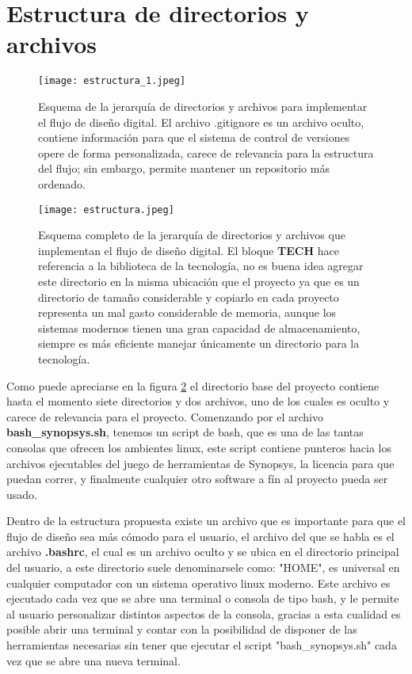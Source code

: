 \section{Estructura de directorios y archivos}

\begin{figure}[h]
\texttt{[image: estructura\_1.jpeg]}
\centering
\caption{Esquema de la jerarquía de directorios y archivos para implementar el flujo de diseño digital. El archivo .gitignore es un archivo oculto, contiene información para que el sistema de control de versiones opere de forma personalizada, carece de relevancia para la estructura del flujo; sin embargo, permite mantener un repositorio más ordenado. \cite{website:gitignore, website:cvs}}
\label{directorios}
\end{figure}


\begin{figure}[h]
\texttt{[image: estructura.jpeg]}
\centering
\caption{Esquema completo de la jerarquía de directorios y archivos que implementan el flujo de diseño digital. El bloque \textbf{TECH} hace referencia a la biblioteca de la tecnología, no es buena idea agregar este directorio en la misma ubicación que el proyecto ya que es un directorio de tamaño considerable y copiarlo en cada proyecto representa un mal gasto considerable de memoria, aunque los sistemas modernos tienen una gran capacidad de almacenamiento, siempre es más eficiente manejar únicamente un directorio para la tecnología.}
\label{directorios}
\end{figure}
Como puede apreciarse en la figura \ref{directorios} el directorio base del proyecto contiene hasta el momento siete directorios y dos archivos, uno de los cuales es oculto y carece de relevancia para el proyecto. Comenzando por el archivo \textbf{bash\_synopsys.sh}, tenemos un script de bash, que es una de las tantas consolas que ofrecen los ambientes linux, este script contiene punteros hacia los archivos ejecutables del juego de herramientas de Synopsys, la licencia para que puedan correr, y finalmente cualquier otro software a fín al proyecto pueda ser usado.

Dentro de la estructura propuesta existe un archivo que es importante para que el flujo de diseño sea más cómodo para el usuario, el archivo del que se habla es el archivo \textbf{.bashrc}, el cual es un archivo oculto y se ubica en el directorio principal del usuario, a este directorio suele denominarsele como: "HOME", es universal en cualquier computador con un sistema operativo linux moderno. Este archivo es ejecutado cada vez que se abre una terminal o consola de tipo bash, y le permite al usuario personalizar distintos aspectos de la consola, gracias a esta cualidad es posible abrir una terminal y contar con la posibilidad de disponer de las herramientas necesarias sin tener que ejecutar el script "bash\_synopsys.sh" cada vez que se abre una nueva terminal.

